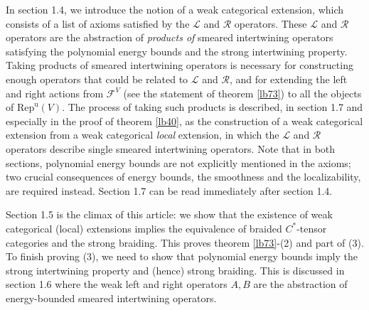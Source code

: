 \documentclass[12pt,a4paper]{article}
\theoremstyle{definition}
\theoremstyle{plain}
\newcommand{\mc}{\mathcal}
\newcommand{\Repu}{\mathrm{Rep}^{\mathrm u}}
\newcommand{\scr}{\mathscr}
\numberwithin{equation}{subsection}
\begin{document}
In section 1.4, we introduce the notion of a weak categorical extension, which consists of a list of axioms satisfied by the $\mc L$ and $\mc R$ operators. These $\mc L$ and $\mc R$ operators are the abstraction of \emph{products of} smeared intertwining operators satisfying the polynomial energy bounds and the strong intertwining property. Taking products  of smeared intertwining operators is necessary for  constructing enough operators that could be related to $\scr L$ and $\scr R$, and for extending the left and right actions from $\mc F^V$ (see the statement of theorem \ref{lb73}) to all the objects of $\Repu(V)$. The process of taking such products is described, in section 1.7 and especially in the proof of theorem \ref{lb40}, as the construction of a weak categorical extension from a weak categorical \emph{local} extension, in which the $\mc L$ and $\mc R$ operators describe single smeared intertwining operators. Note that in both sections, polynomial energy bounds are not explicitly mentioned in the axioms; two crucial consequences of energy bounds, the smoothness and the localizability, are required instead. Section 1.7 can be read immediately after section 1.4.

Section 1.5 is the climax of this article: we show that the existence of weak categorical (local) extensions implies the equivalence of braided $C^*$-tensor categories and the strong braiding. This proves theorem \ref{lb73}-(2) and part of (3). To finish proving (3), we need to show that polynomial energy bounds imply  the strong intertwining property and (hence) strong braiding. This is discussed in section 1.6 where the weak left and right operators $A,B$ are the abstraction of energy-bounded smeared intertwining operators. 
\end{document}
